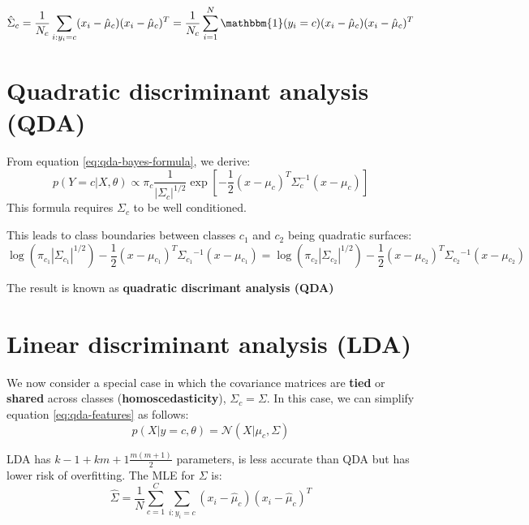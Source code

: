 \documentclass[12pt, a4paper]{article}
\theoremstyle{definition}
\numberwithin{figure}{section}
\numberwithin{equation}{section}
\numberwithin{table}{section}
\begin{document}
\begin{equation}
\hat{\Sigma}_c = \frac{1}{N_c} \sum_{i: y_i = c} (x_i - \hat{\mu}_c)(x_i - \hat{\mu}_c)^T = \frac{1}{N_c} \sum_{i=1}^N \mathbbm{1}(y_i = c) (x_i - \hat{\mu}_c)(x_i - \hat{\mu}_c)^T
\end{equation}

\section{Quadratic discriminant analysis (QDA)}
From equation \ref{eq:qda-bayes-formula}, we derive:
\begin{equation}
p(Y = c | X, \theta) \propto \pi_c \frac{1}{|\Sigma_c|^{1/2}} \exp \left[ -\frac{1}{2} (x - \mu_c)^T \Sigma_c^{-1} (x - \mu_c) \right]
\label{eq:qda-bayes-formula}
\end{equation}
This formula requires $\Sigma_c$ to be well conditioned.

This leads to class boundaries between classes $c_1$ and $c_2$ being quadratic surfaces:
\begin{equation}
\log(\pi{_{c_1}} |\Sigma{_{c_1}}|^{1/2}) - \frac{1}{2} (x - \mu{_{c_1}})^T \Sigma{_{c_1}}^{-1} (x - \mu{_{c_1}})=
\log(\pi{_{c_2}} |\Sigma{_{c_2}}|^{1/2}) - \frac{1}{2} (x - \mu{_{c_2}})^T \Sigma{_{c_2}}^{-1} (x - \mu{_{c_2}})
\label{eq:qda-class-boundaries}
\end{equation}

The result is known as \textbf{quadratic discrimant analysis (QDA)}


\section{Linear discriminant analysis (LDA)}
We now consider a special case in which the covariance matrices are \textbf{tied} or \textbf{shared} across classes (\textbf{homoscedasticity}), $\Sigma_c=\Sigma$. In this case, we can simplify equation \ref{eq:qda-features} as follows:
\begin{equation}
p(X|y=c,\theta)=\mathcal{N}(X|\mu_c, \Sigma)
\end{equation}


LDA has $k-1+km+1\frac{m(m+1)}{2}$ parameters, is less accurate than QDA but has lower risk of overfitting. The MLE for $\Sigma$ is:
\begin{equation}
\hat{\Sigma} = \frac{1}{N} \sum_{c=1}^C \sum_{i:y_i=c} (x_i - \hat{\mu}_c)(x_i - \hat{\mu}_c)^T
\end{equation}
\end{document}
